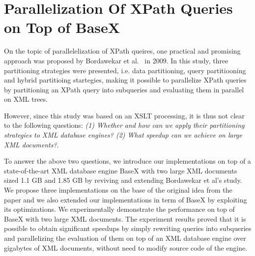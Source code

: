\newcommand{\Placeholder}[1]{$\langle\!\langle\mbox{\textrm{#1}}\rangle\!\rangle$}
\newcommand{\bfn}[1]{\textup{#1}}
\newcommand{\Src}[1]{\texttt{#1}}
\newcommand{\fn}[1]{\mathit{#1}}
\newcommand{\modify}[3]{{\underline{\sf{#1}}:} {\color{blue}{#2}} {\color{green}{\mbox{$\Rightarrow$}}} {\color{red}{#3}}}
\newcommand{\todo}[2]{{\underline{\textsf{#1}}:} {\color{red}{$\spadesuit$#2$\spadesuit$}}}
\newcommand{\hack}{{\color{red}{$\blacklozenge$}}}


\chapter{Parallelization Of XPath Queries on Top of BaseX}

On the topic of parallelelization of XPath queires, one practical and promising
approach was proposed by Bordawekar et al.~\cite{Bord10} in 2009. In this study,
three partitioning strategies were presented, i.e. data partitioning, query
partitiooning  and hybrid partitioing startegies,  making it possible to
parallelize XPath queries by partitioning an XPath query into subqueries and
evaluating them in parallel on XML trees.

However, since this study was based on an XSLT processing, it is thus not clear
to the following questions: \textit{(1) Whether and how can we apply their
partitioning strategies to XML database engines? (2) What speedup can we achieve
on large XML documents?}.

To answer the above two questions, we introduce our implementations on top of a
state-of-the-art XML database engine BaseX with two large XML documents sized 
1.1 GB and 1.85 GB by reviving and extending Bordawekar et al's study. We propose
three implementations on the base of the original idea from the paper and we also
extended our implementations in term of BaseX by exploiting its optimizations.
We experimentally demonstrate the performance on top of BaseX with two large 
XML documents. The experiment results proved that it is
possible to obtain significant speedups by simply rewriting queries into
subqueries and parallelizing the evaluation of them on top of an XML database
engine over gigabytes of XML documents, without need to modify source code of the engine.

%














